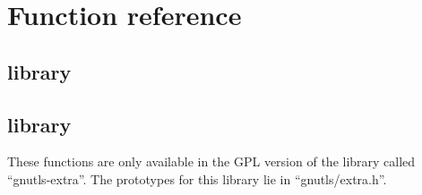 \chapter{Function reference}

\section{\gnutls{} library}


\newpage

\section{\gnutlse{} library}
These functions are only available in the GPL version of the
library called ``gnutls-extra''. The prototypes for this library lie
in ``gnutls/extra.h''.



